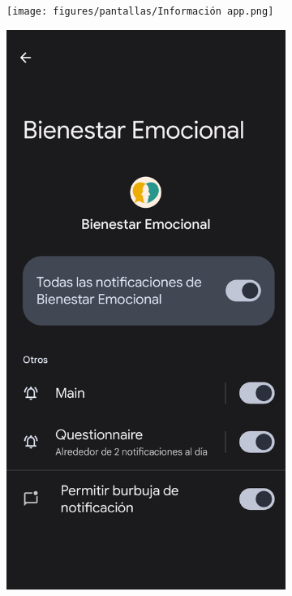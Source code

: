 \begin{figure}[htbp]
\begin{subfigure}[c]{0.29\textwidth}
                	\end{subfigure}
                	\hspace{0.05\textwidth}
                	\begin{subfigure}[c]{0.29\textwidth}
                		\centering
                		\texttt{[image: figures/pantallas/Información app.png]}
                	\end{subfigure}
                    \hspace{0.05\textwidth}
                	\begin{subfigure}[c]{0.29\textwidth}
                		\centering
                		\includegraphics[width=1\linewidth]{figures/pantallas/Permiso notificaciones.png}

\end{subfigure}
\end{figure}
